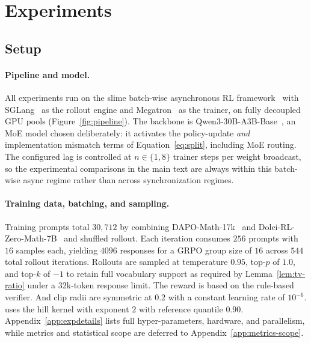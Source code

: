 \section{Experiments}
\label{sec:exp}

\subsection{Setup}
\label{sec:exp-setup}

\paragraph{Pipeline and model.}
All experiments run on the slime batch-wise asynchronous RL framework~\citep{zhu2025slime} with SGLang~\citep{zheng2023sglang} as the rollout engine and Megatron~\citep{shoeybi2019megatron} as the trainer, on fully decoupled GPU pools (Figure~\ref{fig:pipeline}). The backbone is Qwen3-30B-A3B-Base~\citep{yang2025qwen3}, an MoE model chosen deliberately: it activates the policy-update \emph{and} implementation mismatch terms of Equation~\eqref{eq:split}, including MoE routing. The configured lag is controlled at $n\in\{1,8\}$ trainer steps per weight broadcast, so the experimental comparisons in the main text are always within this batch-wise async regime rather than across synchronization regimes.



\paragraph{Training data, batching, and sampling.}
Training prompts total $30{,}712$ by combining {DAPO-Math-17k}~\citep{yu2025dapoopensourcellmreinforcement} and {Dolci-RL-Zero-Math-7B}~\citep{olmo2026olmo3}  and shuffled rollout. Each iteration consumes $256$ prompts with $16$ samples each, yielding $4096$ responses for a GRPO group size of $16$ across $544$ total rollout iterations. Rollouts are sampled at temperature $0.95$, top-$p$ of $1.0$, and top-$k$ of $-1$ to retain full vocabulary support as required by Lemma~\ref{lem:tv-ratio} under a $32$k-token response limit. The reward is based on the rule-based verifier. And clip radii are symmetric at $0.2$ with a constant learning rate of $10^{-6}$. \satr{} uses the hill kernel with exponent $2$ with reference quantile $0.90$. Appendix~\ref{app:expdetails} lists full hyper-parameters, hardware, and parallelism, while metrics and statistical scope are deferred to Appendix~\ref{app:metrics-scope}.

